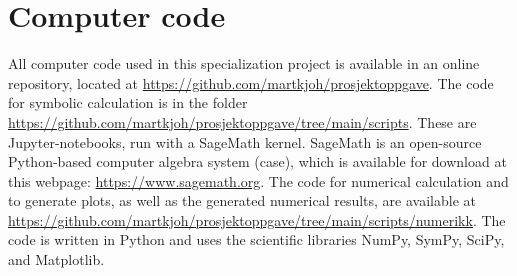 \chapter{Computer code}
\label{appendix:computer code}

All computer code used in this specialization project is available in an online repository, located at \url{https://github.com/martkjoh/prosjektoppgave}.
The code for symbolic calculation is in the folder \url{https://github.com/martkjoh/prosjektoppgave/tree/main/scripts}. These are Jupyter-notebooks, run with a SageMath kernel.
SageMath is an open-source Python-based computer algebra system (case), which is available for download at this webpage: \url{https://www.sagemath.org}.
The code for numerical calculation and to generate plots, as well as the generated numerical results, are available at \url{https://github.com/martkjoh/prosjektoppgave/tree/main/scripts/numerikk}.
The code is written in Python and uses the scientific libraries NumPy, SymPy, SciPy, and Matplotlib.


